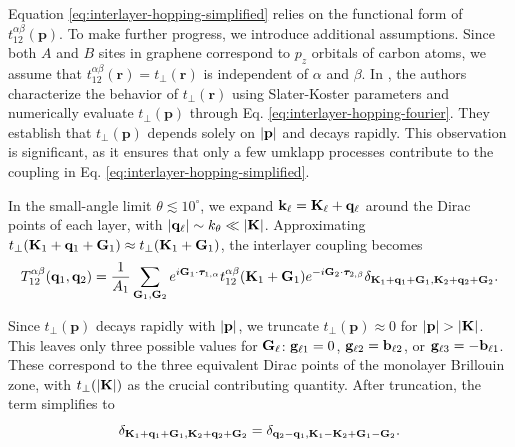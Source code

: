 \n

Equation \eqref{eq:interlayer-hopping-simplified} relies on the functional form of \( t_{12}^{\alpha\beta}(\mathbf{p}) \). To make further progress, we introduce additional assumptions. Since both \( A \) and \( B \) sites in graphene correspond to \( p_z \) orbitals of carbon atoms, we assume that \( t_{12}^{\alpha\beta}(\mathbf{r}) = t_\perp(\mathbf{r}) \) is independent of \( \alpha \) and \( \beta \). In \cite{tperp-laissardiere2012}, the authors characterize the behavior of \( t_\perp(\mathbf{r}) \) using Slater-Koster parameters and numerically evaluate \( t_\perp(\mathbf{p}) \) through Eq. \eqref{eq:interlayer-hopping-fourier}. They establish that \( t_\perp(\mathbf{p}) \) depends solely on \( \abs{\mathbf{p}} \) and decays rapidly. This observation is significant, as it ensures that only a few umklapp processes contribute to the coupling in Eq. \eqref{eq:interlayer-hopping-simplified}.

In the small-angle limit \( \theta \lesssim 10^\circ \), we expand \( \mathbf{k}_\ell = {\vb{K}}_\ell + {\vb{q}}_\ell \) around the Dirac points of each layer, with \( \abs{{\vb{q}}_\ell} \sim k_\theta \ll \abs{{\vb{K}}} \). Approximating \( t_\perp({\vb{K}}_1 + {\vb{q}}_1 + {\vb{G}}_1) \approx t_\perp({\vb{K}}_1 + {\vb{G}}_1) \), the interlayer coupling becomes
\begin{equation} \label{eq:interlayer-hopping-truncation}
T_{12}^{\alpha\beta}({\vb{q}}_1, {\vb{q}}_2) = \frac{1}{A_{1}} \sum_{{\vb{G}}_1, {\vb{G}}_2} e^{i {\vb{G}}_1 \cdot \bm{\tau}_{1,\alpha}}
t_{12}^{\alpha\beta}({\vb{K}}_1 + {\vb{G}}_1) e^{-i {\vb{G}}_2 \cdot \bm{\tau}_{2,\beta}}
\delta_{{\vb{K}}_1 + {\vb{q}}_1 + {\vb{G}}_1, {\vb{K}}_2 + {\vb{q}}_2 + {\vb{G}}_2}.
\end{equation}

Since \( t_\perp(\mathbf{p}) \) decays rapidly with \( \abs{\mathbf{p}} \), we truncate \( t_\perp(\mathbf{p}) \approx 0 \) for \( \abs{\mathbf{p}} > \abs{{\vb{K}}} \). This leaves only three possible values for \( {\vb{G}}_\ell \): \( {\vb{g}}_{\ell 1} = 0 \), \( {\vb{g}}_{\ell 2} = {\vb{b}}_{\ell 2} \), or \( {\vb{g}}_{\ell 3} = -{\vb{b}}_{\ell 1} \). These correspond to the three equivalent Dirac points of the monolayer Brillouin zone, with \( t_\perp(\abs{{\vb{K}}}) \) as the crucial contributing quantity. After truncation, the term simplifies to
\begin{equation} \label{eq:delta-term}
\delta_{{\vb{K}}_1 + {\vb{q}}_1 + {\vb{G}}_1, {\vb{K}}_2 + {\vb{q}}_2 + {\vb{G}}_2} = \delta_{{\vb{q}}_2 - {\vb{q}}_1, {\vb{K}}_1 - {\vb{K}}_2 + {\vb{G}}_1 - {\vb{G}}_2}.
\end{equation}

